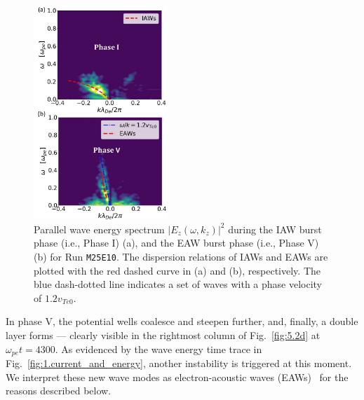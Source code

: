 \documentclass[%
 reprint,
 amsmath,
 amssymb,
 aps,
 prx,
floatfix,
superscriptaddress
]{revtex4-2}
\begin{document}
\begin{figure}[!htbp]
\includegraphics[width=0.45\textwidth]{Fig6.pdf}%
\caption{\label{fig:6.omegak} Parallel wave energy spectrum $|E_z(\omega, k_z)|^2$ during the IAW burst phase (i.e., Phase I) (a), and the EAW burst phase (i.e., Phase V) (b) for Run {\tt M25E10}. The dispersion relations of IAWs and EAWs are plotted with the red dashed curve in (a) and (b), respectively. The blue dash-dotted line indicates a set of waves with a phase velocity of $1.2v_{Te0}$.}
\end{figure}

In phase V, the potential wells coalesce and steepen further, and, finally, a double layer forms --- clearly visible in the rightmost column of Fig.~\ref{fig:5.2d} at $\omega_{pe}t = 4300$. 
As evidenced by the wave energy time trace in Fig.~\ref{fig:1.current_and_energy}, another instability is triggered at this moment.
We interpret these new wave modes as electron-acoustic waves (EAWs)~\cite{holloway1991undamped, valentini2006excitation, valentini2012undamped,anderegg2009electron} for the reasons described below.
\end{document}
